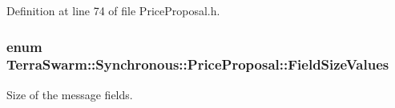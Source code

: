 Definition at line 74 of file Price\-Proposal.\-h.

\hypertarget{class_terra_swarm_1_1_synchronous_1_1_price_proposal_ab2ea7dd828cca1f7635018608f595f0b}{
\subsubsection[{Field\-Size\-Values}]{\setlength{\rightskip}{0pt plus 5cm}enum {\bf Terra\-Swarm\-::\-Synchronous\-::\-Price\-Proposal\-::\-Field\-Size\-Values}\hspace{0.3cm}{\ttfamily [private]}}}\label{class_terra_swarm_1_1_synchronous_1_1_price_proposal_ab2ea7dd828cca1f7635018608f595f0b}


Size of the message fields. 

